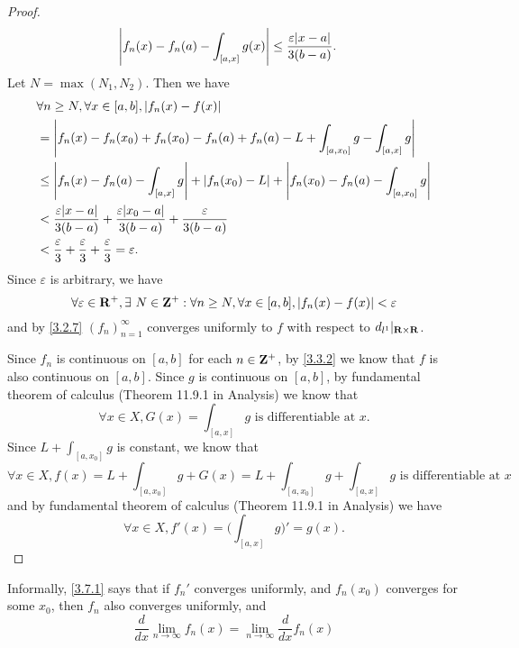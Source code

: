 \begin{proof}
\begin{align*}
             & \abs{f_n(x) - f_n(a) - \int_{[a, x]} g(x)} \leq \frac{\varepsilon \abs{x - a}}{3(b - a)}.
  \end{align*}
  Let \(N = \max(N_1, N_2)\).
  Then we have
  \begin{align*}
     & \forall n \geq N, \forall x \in [a, b], \abs{f_n(x) - f(x)}                                                            \\
     & = \abs{f_n(x) - f_n(x_0) + f_n(x_0) - f_n(a) + f_n(a) - L + \int_{[a, x_0]} g - \int_{[a, x]} g}                       \\
     & \leq \abs{f_n(x) - f_n(a) - \int_{[a, x]} g} + \abs{f_n(x_0) - L} + \abs{f_n(x_0) - f_n(a) - \int_{[a, x_0]} g}        \\
     & < \frac{\varepsilon \abs{x - a}}{3(b - a)} + \frac{\varepsilon \abs{x_0 - a}}{3(b - a)} + \frac{\varepsilon}{3(b - a)} \\
     & < \frac{\varepsilon}{3} + \frac{\varepsilon}{3} + \frac{\varepsilon}{3} = \varepsilon.
  \end{align*}
  Since \(\varepsilon\) is arbitrary, we have
  \[
    \forall \varepsilon \in \mathbf{R}^+, \exists\ N \in \mathbf{Z}^+ : \forall n \geq N, \forall x \in [a, b], \left\lvert f_n(x) - f(x)\right\rvert < \varepsilon
  \]
  and by \cref{3.2.7} \((f_n)_{n = 1}^\infty\) converges uniformly to \(f\) with respect to \(d_{l^1}|_{\mathbf{R} \times \mathbf{R}}\).

  Since \(f_n\) is continuous on \([a, b]\) for each \(n \in \mathbf{Z}^+\), by \cref{3.3.2} we know that \(f\) is also continuous on \([a, b]\).
  Since \(g\) is continuous on \([a, b]\), by fundamental theorem of calculus (Theorem 11.9.1 in Analysis) we know that
  \[
    \forall x \in X, G(x) = \int_{[a, x]} g \text{ is differentiable at } x.
  \]
  Since \(L + \int_{[a, x_0]} g\) is constant, we know that
  \[
    \forall x \in X, f(x) = L + \int_{[a, x_0]} g + G(x) = L + \int_{[a, x_0]} g + \int_{[a, x]} g \text{ is differentiable at } x
  \]
  and by fundamental theorem of calculus (Theorem 11.9.1 in Analysis) we have
  \[
    \forall x \in X, f'(x) = \bigg(\int_{[a, x]} g\bigg)' = g(x).
  \]
\end{proof}

\begin{note}
  Informally, \cref{3.7.1} says that if \(f_n'\) converges uniformly, and \(f_n(x_0)\) converges for some \(x_0\), then \(f_n\) also converges uniformly, and
  \[
    \frac{d}{dx} \lim_{n \to \infty} f_n(x) = \lim_{n \to \infty} \frac{d}{dx} f_n(x)
  \]
\end{note}

